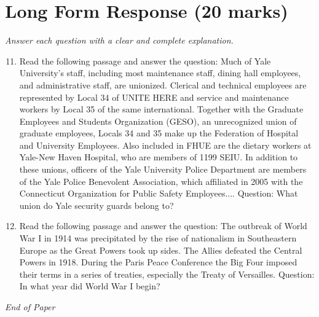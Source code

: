 \documentclass[12pt]{article}
\begin{document}
\section*{Long Form Response (20 marks)}
\textit{Answer each question with a clear and complete explanation.}
\begin{enumerate}[label=\arabic*.]
\setcounter{enumi}{10}
\item Read the following passage and answer the question: Much of Yale University's staff, including most maintenance staff, dining hall employees, and administrative staff, are unionized. Clerical and technical employees are represented by Local 34 of UNITE HERE and service and maintenance workers by Local 35 of the same international. Together with the Graduate Employees and Students Organization (GESO), an unrecognized union of graduate employees, Locals 34 and 35 make up the Federation of Hospital and University Employees. Also included in FHUE are the dietary workers at Yale-New Haven Hospital, who are members of 1199 SEIU. In addition to these unions, officers of the Yale University Police Department are members of the Yale Police Benevolent Association, which affiliated in 2005 with the Connecticut Organization for Public Safety Employees.... Question: What union do Yale security guards belong to?
\item Read the following passage and answer the question: The outbreak of World War I in 1914 was precipitated by the rise of nationalism in Southeastern Europe as the Great Powers took up sides. The Allies defeated the Central Powers in 1918. During the Paris Peace Conference the Big Four imposed their terms in a series of treaties, especially the Treaty of Versailles. Question: In what year did World War I begin?
\end{enumerate}

\vfill
\noindent\textit{End of Paper}
\end{document}

